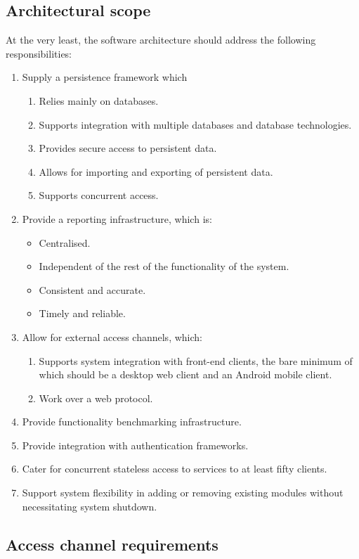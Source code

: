 \documentclass[a4paper,10pt]{article}
\begin{document}
\subsection{Architectural scope}
At the very least, the software architecture should address the following responsibilities:
\begin{enumerate}
	\item Supply a persistence framework which
	\begin{enumerate}
		\item Relies mainly on databases.
		\item Supports integration with multiple databases and database technologies.
		\item Provides secure access to persistent data.
		\item Allows for importing and exporting of persistent data.
		\item Supports concurrent access.
	\end{enumerate} 
	\item Provide a reporting infrastructure, which is:
	\begin{itemize}
		\item Centralised.
		\item Independent of the rest of the functionality of the system.
		\item Consistent and accurate.
		\item Timely and reliable.
	\end{itemize}
	\item Allow for external access channels, which:
	\begin{enumerate}
		\item Supports system integration with front-end clients, the bare minimum of which should be a desktop web client and an Android mobile client.
		\item Work over a web protocol.
	\end{enumerate}
	\item Provide functionality benchmarking infrastructure.
	\item Provide integration with authentication frameworks.
	\item Cater for concurrent stateless access to services to at least fifty clients.
	\item Support system flexibility in adding or removing existing modules without necessitating system shutdown.
\end{enumerate}
\subsection{Access channel requirements}
\end{document}
